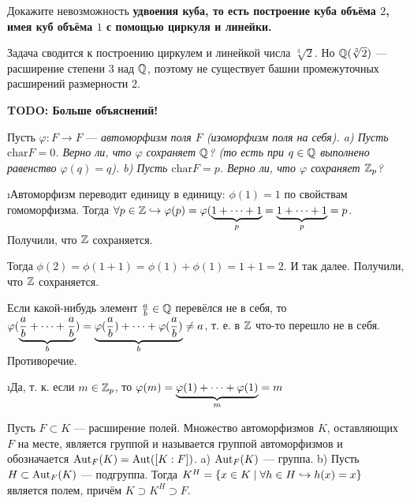 \begin{problem}[39 (9.12а)]
Докажите невозможность \bf{удвоения куба}, то есть построение куба объёма $2$, имея куб объёма $1$ с помощью циркуля и линейки.
\end{problem}

\begin{solution}
Задача сводится к построению циркулем и линейкой числа \(\sqrt[3]{2}\). Но \(\mathbb{Q}(\sqrt[3]{2})\) --- расширение степени 3 над \(\mathbb{Q}\), поэтому не существует башни промежуточных расширений размерности 2.

\bf{TODO: Больше объяснений!}
\end{solution}

\begin{problem}[40 (10.2)]
Пусть $\varphi: F \to F$ --- \it{автоморфизм поля} $F$ (изоморфизм поля на себя). 
a) Пусть $\mathrm{char} F =0$. Верно ли, что $\varphi$ сохраняет $\mathbb{Q}$? (то есть при $q\in\mathbb{Q}$ выполнено равенство $\varphi(q)=q$).
b) Пусть $\mathrm{char} F =p$. Верно ли, что $\varphi$ сохраняет $\mathbb{Z}_p$?
\end{problem}

\begin{solution}
\begin{enumerate}
\def\labelenumi{\alph{enumi})}
\i Автоморфизм переводит единицу в единицу: \(\phi(1) = 1\) по свойствам гомоморфизма.
Тогда \(\forall p \in \mathbb{Z} \hookrightarrow \varphi(p) = \varphi(\underbrace{1+\dots+1}_{p} = \underbrace{1+\dots+1}_{p} = p\). Получили, что \(\mathbb{Z}\) сохраняется.

Тогда $\phi(2) = \phi(1+1) = \phi(1)+\phi(1)=1+1=2$.
И так далее. Получили, что $\mathbb{Z}$ сохраняется.

Если какой-нибудь элемент $\frac{a}{b} \in \mathbb{Q}$ перевёлся не в себя, то $\varphi(\underbrace{\frac{a}{b}+\dots+\frac{a}{b}}_{b}) = \underbrace{\varphi(\frac{a}{b})+\dots+\varphi(\frac{a}{b})}_{b} \ne a$, т. е. в $\mathbb{Z}$ что-то перешло не в себя. Противоречие.
%

\i Да, т. к. если \(m \in \mathbb{Z}_p\), то \(\varphi(m) = \underbrace{\varphi(1)+\dots+\varphi(1)}_{m} = m\)
\end{enumerate}
\end{solution}

\begin{problem}
Пусть $F \subset K$ — расширение полей. Множество автоморфизмов $K$, оставляющих $F$ на месте, является группой и называется группой автоморфизмов и обозначается $\operatorname{Aut}_F(K) = \operatorname{Aut}([K : F])$.
a) $\operatorname{Aut}_F(K)$ — группа.
b) Пусть $H \subset \operatorname{Aut}_F(K)$ --- подгруппа. Тогда $K^H = \{x \in K \mid \forall h \in H \hookrightarrow h(x) = x\}$ является полем, причём $K \supset K^H \supset F$.
\end{problem}

